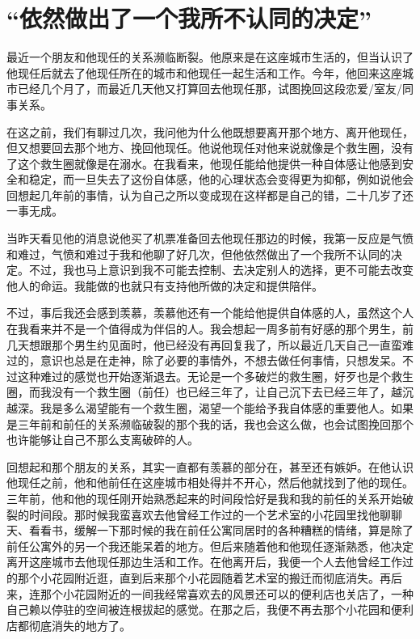 \chapter{“依然做出了一个我所不认同的决定”}





最近一个朋友和他现任的关系濒临断裂。他原来是在这座城市生活的，但当认识了他现任后就去了他现任所在的城市和他现任一起生活和工作。今年，他回来这座城市已经几个月了，而最近几天他又打算回去他现任那，试图挽回这段恋爱/室友/同事关系。

在这之前，我们有聊过几次，我问他为什么他既想要离开那个地方、离开他现任，但又想要回去那个地方、挽回他现任。他说他现任对他来说就像是个救生圈，没有了这个救生圈就像是在溺水。在我看来，他现任能给他提供一种自体感\pozhehao{}让他感到安全和稳定，而一旦失去了这份自体感，他的心理状态会变得更为抑郁，例如说他会回想起几年前的事情，认为自己之所以变成现在这样都是自己的错，二十几岁了还一事无成。

当昨天看见他的消息说他买了机票准备回去他现任那边的时候，我第一反应是气愤和难过，气愤和难过于我和他聊了好几次，但他依然做出了一个我所不认同的决定。不过，我也马上意识到我不可能去控制、去决定别人的选择，更不可能去改变他人的命运。我能做的也就只有支持他所做的决定和提供陪伴。

不过，事后我还会感到羡慕，羡慕他还有一个能给他提供自体感的人，虽然这个人在我看来并不是一个值得成为伴侣的人。我会想起一周多前有好感的那个男生，前几天想跟那个男生约见面时，他已经没有再回复我了，所以最近几天自己一直蛮难过的，意识也总是在走神，除了必要的事情外，不想去做任何事情，只想发呆。不过这种难过的感觉也开始逐渐退去。无论是一个多破烂的救生圈，好歹也是个救生圈，而我没有一个救生圈（前任）也已经三年了，让自己沉下去已经三年了，越沉越深。我是多么渴望能有一个救生圈，渴望一个能给予我自体感的重要他人。如果是三年前和前任的关系濒临破裂的那个我的话，我也会这么做，也会试图挽回那个也许能够让自己不那么支离破碎的人。

回想起和那个朋友的关系，其实一直都有羡慕的部分在，甚至还有嫉妒。在他认识他现任之前，他和他前任在这座城市相处得并不开心，然后他就找到了他的现任。三年前，他和他的现任刚开始熟悉起来的时间段恰好是我和我的前任的关系开始破裂的时间段。那时候我蛮喜欢去他曾经工作过的一个艺术室的小花园里找他聊聊天、看看书，缓解一下那时候的我在前任公寓同居时的各种糟糕的情绪，算是除了前任公寓外的另一个我还能呆着的地方。但后来随着他和他现任逐渐熟悉，他决定离开这座城市去他现任那边生活和工作。在他离开后，我便一个人去他曾经工作过的那个小花园附近逛，直到后来那个小花园随着艺术室的搬迁而彻底消失。再后来，连那个小花园附近的一间我经常喜欢去的风景还可以的便利店也关店了，一种自己赖以停驻的空间被连根拔起的感觉。在那之后，我便不再去那个小花园和便利店都彻底消失的地方了。


